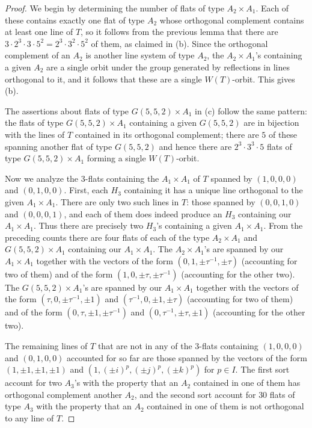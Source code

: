 \documentclass[11pt, reqno]{amsart}
\numberwithin{equation}{section}
\theoremstyle{definition}
\theoremstyle{plain}
\begin{document}
\begin{proof}
We begin by determining the number of flats of type $A_2 \times A_1$. Each of these contains exactly one flat of type $A_2$ whose orthogonal complement contains at least one line of $T$, so it follows from the previous lemma that there are $3 \cdot 2^3 \cdot 3 \cdot 5^2=2^3 \cdot 3^2 \cdot 5^2$ of them, as claimed in (b). Since the orthogonal complement of an $A_2$ is another line system of type $A_2$, the $A_2 \times A_1$'s containing a given $A_2$ are a single orbit under the group generated by reflections in lines orthogonal to it, and it follows that these are a single $W(T)$-orbit. This gives (b).

The assertions about flats of type $G(5,5,2) \times A_1$ in (c) follow the same pattern: the flats of type $G(5,5,2) \times A_1$ containing a given $G(5,5,2)$ are in bijection with the lines of $T$ contained in its orthogonal complement; there are $5$ of these spanning another flat of type $G(5,5,2)$ and hence there are $2^3 \cdot 3^3 \cdot 5$ flats of type $G(5,5,2) \times A_1$ forming a single $W(T)$-orbit. 

Now we analyze the $3$-flats containing the $A_1 \times A_1$ of $T$ spanned by $(1,0,0,0)$ and $(0,1,0,0)$. First, each $H_3$ containing it has a unique line orthogonal to the given $A_1 \times A_1$. There are only two such lines in $T$: those spanned by $(0,0,1,0)$ and $(0,0,0,1)$, and each of them does indeed produce an $H_3$ containing our $A_1 \times A_1$. Thus there are precisely two $H_3$'s containing a given $A_1 \times A_1$. From the preceding counts there are four flats of each of the type $A_2 \times A_1$ and $G(5,5,2) \times A_1$ containing our $A_1 \times A_1$. The $A_2 \times A_1$'s are spanned by our $A_1 \times A_1$ together with the vectors of the form $(0,1,\pm \tau^{-1},\pm \tau)$ (accounting for two of them) and of the form $(1,0,\pm \tau,\pm \tau^{-1})$ (accounting for the other two). The $G(5,5,2) \times A_1$'s are spanned by our $A_1 \times A_1$ together with the vectors of the form $(\tau,0,\pm \tau^{-1}, \pm 1)$ and $(\tau^{-1},0,\pm 1,\pm \tau)$ (accounting for two of them) and of the form $(0,\tau,\pm 1,\pm \tau^{-1})$ and $(0,\tau^{-1},\pm \tau, \pm 1)$ (accounting for the other two).

The remaining lines of $T$ that are not in any of the $3$-flats containing $(1,0,0,0)$ and $(0,1,0,0)$ accounted for so far are those spanned by the vectors of the form $(1,\pm 1,\pm 1,\pm 1)$ and $(1,(\pm i)^p,(\pm j)^p,(\pm k)^p)$ for $p \in I$. The first sort account for two $A_3$'s with the property that an $A_2$ contained in one of them has orthogonal complement another $A_2$, and the second sort account for $30$ flats of type $A_3$ with the property that an $A_2$ contained in one of them is not orthogonal to any line of $T$. 


\end{proof}
\end{document}
